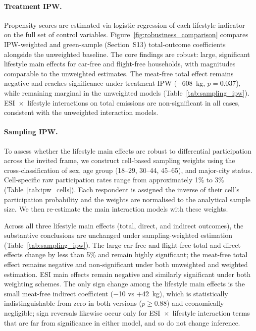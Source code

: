 \documentclass[12pt]{article}
\begin{document}
\paragraph{Treatment IPW.}
Propensity scores are estimated via logistic regression of each lifestyle indicator on the full set of control variables. Figure~\ref{fig:robustness_comparison} compares IPW-weighted and green-sample (Section~S13) total-outcome coefficients alongside the unweighted baseline. The core findings are robust: large, significant lifestyle main effects for car-free and flight-free households, with magnitudes comparable to the unweighted estimates. The meat-free total effect remains negative and reaches significance under treatment IPW ($-$608~kg, $p = 0.037$), while remaining marginal in the unweighted models (Table~\ref{tab:sampling_ipw}). ESI~$\times$~lifestyle interactions on total emissions are non-significant in all cases, consistent with the unweighted interaction models.

\paragraph{Sampling IPW.}
To assess whether the lifestyle main effects are robust to differential participation across the invited frame, we construct cell-based sampling weights using the cross-classification of sex, age group (18--29, 30--44, 45--65), and major-city status. Cell-specific raw participation rates range from approximately 1\% to 3\% (Table~\ref{tab:ipw_cells}). Each respondent is assigned the inverse of their cell's participation probability and the weights are normalised to the analytical sample size. We then re-estimate the main interaction models with these weights.

Across all three lifestyle main effects (total, direct, and indirect outcomes), the substantive conclusions are unchanged under sampling-weighted estimation (Table~\ref{tab:sampling_ipw}). The large car-free and flight-free total and direct effects change by less than 5\% and remain highly significant; the meat-free total effect remains negative and non-significant under both unweighted and weighted estimation. ESI main effects remain negative and similarly significant under both weighting schemes. The only sign change among the lifestyle main effects is the small meat-free indirect coefficient ($-$10 vs $+$42~kg), which is statistically indistinguishable from zero in both versions ($p\geq0.88$) and economically negligible; sign reversals likewise occur only for ESI~$\times$~lifestyle interaction terms that are far from significance in either model, and so do not change inference.
\end{document}
